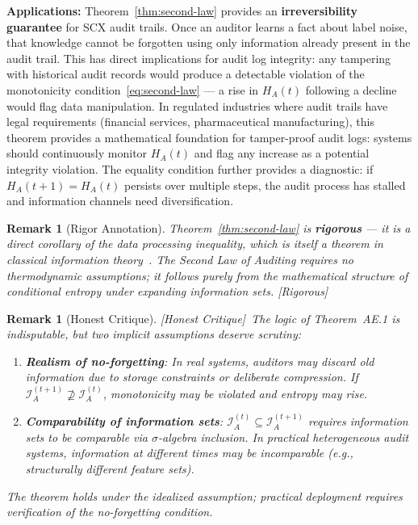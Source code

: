 \documentclass[12pt,a4paper]{article}
\newtheorem{remark}[theorem]{Remark}
\newcommand{\rigorous}{\textcolor{green!50!black}{\small\textsf{[Rigorous]}}}
\newcommand{\hcritique}{\textcolor{blue!60!black}{\small\textsf{[Honest Critique]}}}
\newcommand{\cI}{\mathcal{I}}
\begin{document}
\medskip\noindent
\textbf{Applications:}
Theorem~\ref{thm:second-law} provides an \textbf{irreversibility guarantee} for SCX audit trails. Once an auditor learns a fact about label noise, that knowledge cannot be forgotten using only information already present in the audit trail. This has direct implications for audit log integrity: any tampering with historical audit records would produce a detectable violation of the monotonicity condition~\eqref{eq:second-law} --- a rise in $H_A(t)$ following a decline would flag data manipulation. In regulated industries where audit trails have legal requirements (financial services, pharmaceutical manufacturing), this theorem provides a mathematical foundation for tamper-proof audit logs: systems should continuously monitor $H_A(t)$ and flag any increase as a potential integrity violation. The equality condition further provides a diagnostic: if $H_A(t+1)=H_A(t)$ persists over multiple steps, the audit process has stalled and information channels need diversification.

\begin{remark}[Rigor Annotation]
Theorem~\ref{thm:second-law} is \textbf{rigorous} --- it is a direct corollary of the data processing inequality, which is itself a theorem in classical information theory~\citep{cover1999elements}. The Second Law of Auditing requires no thermodynamic assumptions; it follows purely from the mathematical structure of conditional entropy under expanding information sets. \rigorous
\end{remark}

\begin{remark}[Honest Critique]
\label{crit:ae1}
\hcritique~The logic of Theorem~AE.1 is indisputable, but two implicit assumptions deserve scrutiny:
\begin{enumerate}
    \item \textbf{Realism of no-forgetting}: In real systems, auditors may discard old information due to storage constraints or deliberate compression. If $\cI_A^{(t+1)} \not\supseteq \cI_A^{(t)}$, monotonicity may be violated and entropy may rise.
    \item \textbf{Comparability of information sets}: $\cI_A^{(t)} \subseteq \cI_A^{(t+1)}$ requires information sets to be comparable via $\sigma$-algebra inclusion. In practical heterogeneous audit systems, information at different times may be incomparable (e.g., structurally different feature sets).
\end{enumerate}
The theorem holds under the idealized assumption; practical deployment requires verification of the no-forgetting condition.
\end{remark}
\end{document}
